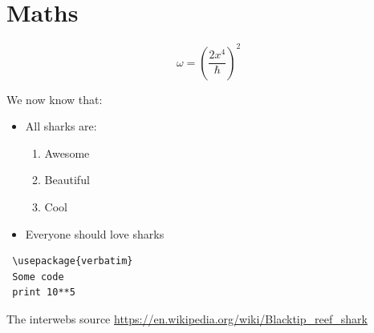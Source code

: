 \documentclass[a4paper,10pt,twoside]{article}
\begin{document}
\section{Maths}
\label{sec:maths}

\begin{equation}
\label{eq:random}
 \omega = \left(\frac{2x^4}{\hbar}\right)^2
\end{equation}

We now know that:
\begin{itemize}
 \item All sharks are:
 \begin{enumerate}
  \item Awesome 
  \item Beautiful
  \item Cool
 \end{enumerate}
 \item Everyone should love sharks
\end{itemize}

\begin{verbatim}
 \usepackage{verbatim}
 Some code 
 print 10**5 
\end{verbatim}




\begin{thebibliography}{99}
  The interwebs source \url{https://en.wikipedia.org/wiki/Blacktip_reef_shark}
\end{thebibliography}
\end{document}
